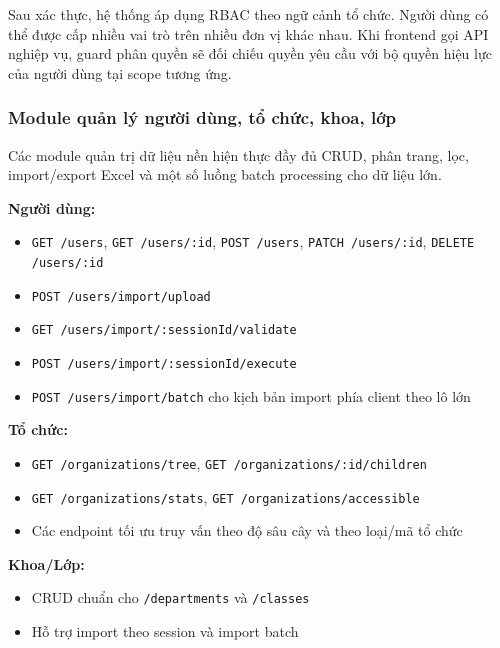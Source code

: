 Sau xác thực, hệ thống áp dụng RBAC theo ngữ cảnh tổ chức. Người dùng có thể được cấp nhiều vai trò trên nhiều đơn vị khác nhau. Khi frontend gọi API nghiệp vụ, guard phân quyền sẽ đối chiếu quyền yêu cầu với bộ quyền hiệu lực của người dùng tại scope tương ứng.

\subsubsection{Module quản lý người dùng, tổ chức, khoa, lớp}
Các module quản trị dữ liệu nền hiện thực đầy đủ CRUD, phân trang, lọc, import/export Excel và một số luồng batch processing cho dữ liệu lớn.

\textbf{Người dùng:}
\begin{itemize}
	\item \texttt{GET /users}, \texttt{GET /users/:id}, \texttt{POST /users}, \texttt{PATCH /users/:id}, \texttt{DELETE /users/:id}
	\item \texttt{POST /users/import/upload}
	\item \texttt{GET /users/import/:sessionId/validate}
	\item \texttt{POST /users/import/:sessionId/execute}
	\item \texttt{POST /users/import/batch} cho kịch bản import phía client theo lô lớn
\end{itemize}

\textbf{Tổ chức:}
\begin{itemize}
	\item \texttt{GET /organizations/tree}, \texttt{GET /organizations/:id/children}
	\item \texttt{GET /organizations/stats}, \texttt{GET /organizations/accessible}
	\item Các endpoint tối ưu truy vấn theo độ sâu cây và theo loại/mã tổ chức
\end{itemize}

\textbf{Khoa/Lớp:}
\begin{itemize}
	\item CRUD chuẩn cho \texttt{/departments} và \texttt{/classes}
	\item Hỗ trợ import theo session và import batch
\end{itemize}

